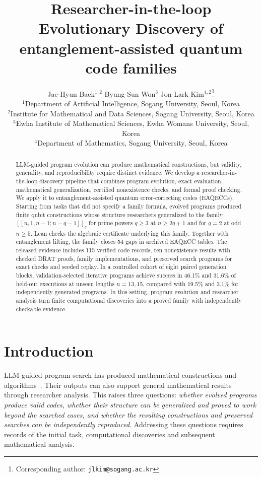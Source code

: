 \documentclass{article}
\title{Researcher-in-the-loop\\
  Evolutionary Discovery of\\
  entanglement-assisted quantum code families}
\author{Jae-Hyun Baek$^{1,2}$ \quad Byung-Sun Won$^{3}$ \quad Jon-Lark Kim$^{4,2}$\thanks{Corresponding author: \texttt{jlkim@sogang.ac.kr}} \\
$^{1}$Department of Artificial Intelligence, Sogang University, Seoul, Korea \\
$^{2}$Institute for Mathematical and Data Sciences, Sogang University, Seoul, Korea \\
$^{3}$Ewha Institute of Mathematical Sciences, Ewha Womans University, Seoul, Korea \\
$^{4}$Department of Mathematics, Sogang University, Seoul, Korea}
\begin{document}
\maketitle
\lhead{}\renewcommand{\headrulewidth}{0pt}

\begin{abstract}
LLM-guided program evolution can produce mathematical constructions,
but validity, generality, and reproducibility require distinct evidence.
We develop a researcher-in-the-loop discovery pipeline that combines
program evolution, exact evaluation, mathematical generalization,
certified nonexistence checks, and formal proof checking. We apply it
to entanglement-assisted quantum error-correcting codes (EAQECCs).
Starting from tasks that did not specify a family formula, evolved
programs produced finite qubit constructions whose structure researchers
generalized to the family $[[n,1,n-1;n-q-1]]_q$ for prime powers
$q\ge3$ at $n\ge2q+1$ and for $q=2$ at odd $n\ge5$. Lean checks the
algebraic certificate underlying this family. Together with entanglement
lifting, the family closes 54 gaps in archived EAQECC tables. The
released evidence includes 115 verified code records, ten nonexistence
results with checked DRAT proofs, family implementations, and preserved
search programs for exact checks and seeded replay. In a controlled
cohort of eight paired generation blocks, validation-selected iterative
programs achieve success in 46.1\% and 31.6\% of held-out executions at
unseen lengths $n=13,15$, compared with 19.5\% and 3.1\% for independently
generated programs. In this setting, program evolution and researcher
analysis turn finite computational discoveries into a proved family
with independently checkable evidence.
\end{abstract}

\section{Introduction}

LLM-guided program search has produced mathematical constructions and
algorithms~\citep{FunSearch,AlphaEvolve}. Their outputs can also support
general mathematical results through researcher analysis. This raises
three questions: \emph{whether evolved programs produce valid codes,
whether their structure can be generalized and proved to work beyond
the searched cases, and whether the resulting constructions and preserved
searches can be independently reproduced}. Addressing these questions
requires records of the initial task, computational discoveries and
subsequent mathematical analysis.
\end{document}
